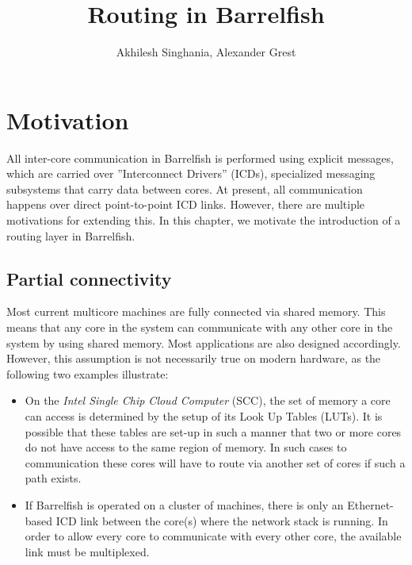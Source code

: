 \documentclass[a4paper,twoside]{report} %
\title{Routing in Barrelfish}   %
\author{Akhilesh Singhania, Alexander Grest}	%
\begin{document}
\maketitle

%
%
\begin{versionhistory}
\end{versionhistory}


\chapter{Motivation}

All inter-core communication in Barrelfish is performed using explicit messages, which are carried over ''Interconnect Drivers'' (ICDs), specialized messaging subsystems that carry data between cores. At present, all communication happens over direct point-to-point ICD links. However, there are multiple motivations for extending this. In this chapter, we motivate the introduction of a routing layer in Barrelfish.


\section{Partial connectivity}
Most current multicore machines are fully connected via shared memory. This means that any core in the system can communicate with any other core in the system
by using shared memory. Most applications are also designed accordingly. However, this assumption is not necessarily true on modern hardware, as the following two examples illustrate:

\begin{itemize}

\item On the \emph{Intel Single Chip Cloud Computer} (SCC), the set of memory a core can access is determined by the setup of its Look Up Tables (LUTs). It is possible that these tables are set-up in such a manner that
two or more cores do not have access to the same region of memory. In such cases to communication these cores will have to route via another set of cores if such a path exists.

\item If Barrelfish is operated on a cluster of machines, there is only an Ethernet-based ICD link between the core(s) where the network stack is running. In order to allow every core to communicate with every other core, the available link must be multiplexed. 

\end{itemize}
\end{document}
